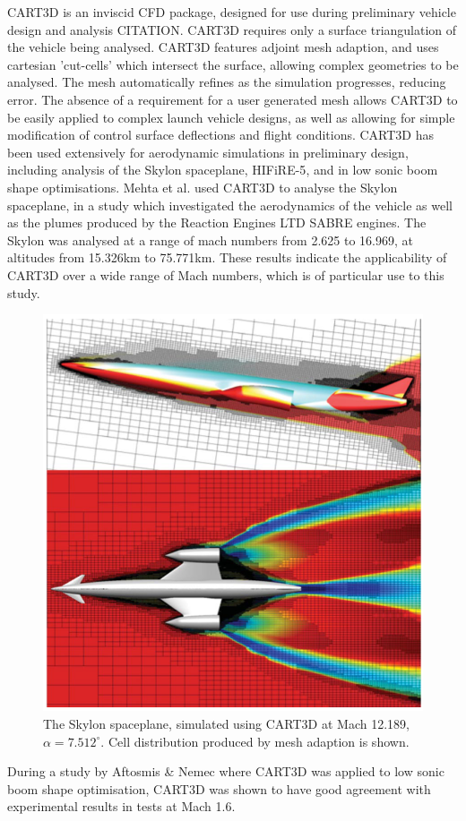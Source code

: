 CART3D is an inviscid CFD package, designed for use during preliminary vehicle design and analysis CITATION. CART3D requires only a surface triangulation of the vehicle being analysed. CART3D features adjoint mesh adaption, and uses cartesian 'cut-cells' which intersect the surface, allowing complex geometries to be analysed. The mesh automatically refines as the simulation progresses, reducing error. The absence of a requirement for a user generated mesh allows CART3D to be easily applied to complex launch vehicle designs, as well as allowing for simple modification of control surface deflections and flight conditions. 
CART3D has been used extensively for aerodynamic simulations in preliminary design, including analysis of the Skylon spaceplane\cite{Mehta2016}, HIFiRE-5\cite{Kimmel2010}, and in low sonic boom shape optimisations\cite{Aftosmis2011}. 
Mehta et al. used CART3D to analyse the Skylon spaceplane, in a study which investigated the aerodynamics of the vehicle as well as the plumes produced by the Reaction Engines LTD SABRE engines\cite{Mehta2016}. The Skylon was analysed at a range of mach numbers from 2.625 to 16.969, at altitudes from 15.326km to 75.771km. These results indicate the applicability of CART3D over a wide range of Mach numbers, which is of particular use to this study.
\begin{figure}
\centering
\includegraphics[width=0.6\linewidth]{figures/2_literature-review/Skylon-CART3D}
\caption{The Skylon spaceplane, simulated using CART3D at Mach 12.189, $\alpha=7.512^\circ$\cite{Mehta2016}. Cell distribution produced by mesh adaption is shown.}
\label{fig:Skylon-CART3D}
\end{figure}
During a study by Aftosmis \& Nemec where CART3D was applied to low sonic boom shape optimisation, CART3D was shown to have good agreement with experimental results in tests at Mach 1.6. 

